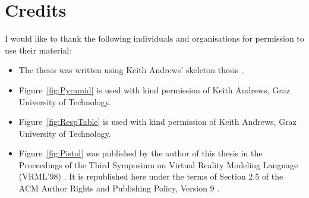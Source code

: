 %
%
% 
% 
% 


\chapter*{Credits}

I would like to thank the following individuals and organisations for
permission to use their material:
\begin{itemize}
\item The thesis was written using Keith Andrews' skeleton
  thesis \parencite{KeithThesis}.

\item Figure~\ref{fig:Pyramid} is used with kind permission of Keith
  Andrews, Graz University of Technology.

\item Figure~\ref{fig:RespTable} is used with kind permission of Keith
  Andrews, Graz University of Technology.

\item Figure~\ref{fig:Pistol} was published by the author of this
  thesis in the Proceedings of the Third Symposium on Virtual Reality
  Modeling Language (VRML'98) \parencite{Andrews-VRwave}. It is
  republished here under the terms of Section 2.5 of the ACM Author
  Rights and Publishing Policy, Version 9 \parencite{ACM-Policy}.
\end{itemize}


